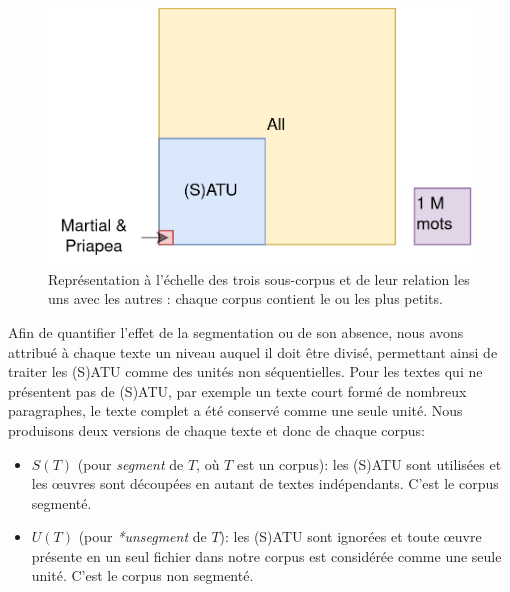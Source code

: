 \begin{figure}
    \centering
    \includegraphics[width=0.6\linewidth]{figures/chap1/part2/VennCorpus.png}
    \caption{Représentation à l'échelle des trois sous-corpus et de leur relation les uns avec les autres : chaque corpus contient le ou les plus petits. }
    \label{fig:venn}
\end{figure}

Afin de quantifier l'effet de la segmentation ou de son absence, nous avons attribué à chaque texte un niveau auquel il doit être divisé, permettant ainsi de traiter les (S)ATU comme des unités non séquentielles. Pour les textes qui ne présentent pas de (S)ATU, par exemple un texte court formé de nombreux paragraphes, le texte complet a été conservé comme une seule unité. Nous produisons deux versions de chaque texte et donc de chaque corpus:
\begin{itemize}
    \item $S(T)$ (pour \textit{segment} de $T$, où $T$ est un corpus): les (S)ATU sont utilisées et les œuvres sont découpées en autant de textes indépendants. C'est le corpus segmenté.
    \item $U(T)$ (pour \textit{*unsegment} de $T$): les (S)ATU sont ignorées et toute œuvre présente en un seul fichier dans notre corpus est considérée comme une seule unité. C'est le corpus non segmenté.
\end{itemize}

